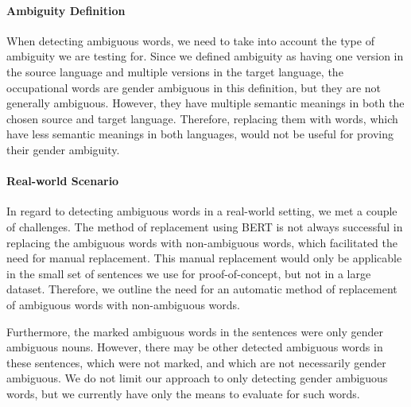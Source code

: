 \paragraph{Ambiguity Definition}
When detecting ambiguous words, we need to take into account the type of ambiguity we are testing for. Since we defined ambiguity as having one version in the source language and multiple versions in the target language, the occupational words are gender ambiguous in this definition, but they are not generally ambiguous. However, they have multiple semantic meanings in both the chosen source and target language. Therefore, replacing them with words, which have less semantic meanings in both languages, would not be useful for proving their gender ambiguity.

\paragraph{Real-world Scenario}
In regard to detecting ambiguous words in a real-world setting, we met a couple of challenges. The method of replacement using BERT is not always successful in replacing the ambiguous words with non-ambiguous words, which facilitated the need for manual replacement. This manual replacement would only be applicable in the small set of sentences we use for proof-of-concept, but not in a large dataset. Therefore, we outline the need for an automatic method of replacement of ambiguous words with non-ambiguous words. 

Furthermore, the marked ambiguous words in the sentences were only gender ambiguous nouns. However, there may be other detected ambiguous words in these sentences, which were not marked, and which are not necessarily gender ambiguous. We do not limit our approach to only detecting gender ambiguous words, but we currently have only the means to evaluate for such words.



